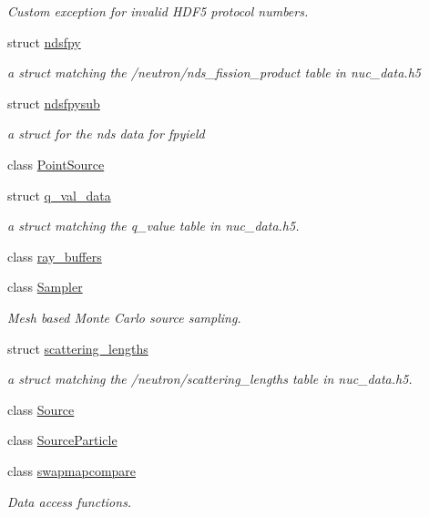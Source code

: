 \begin{DoxyCompactItemize}
\begin{DoxyCompactList}\small\item\em Custom exception for invalid H\+D\+F5 protocol numbers. \end{DoxyCompactList}\item 
struct \hyperlink{structpyne_1_1ndsfpy}{ndsfpy}
\begin{DoxyCompactList}\small\item\em a struct matching the \textquotesingle{}/neutron/nds\+\_\+fission\+\_\+product\textquotesingle{} table in nuc\+\_\+data.\+h5 \end{DoxyCompactList}\item 
struct \hyperlink{structpyne_1_1ndsfpysub}{ndsfpysub}
\begin{DoxyCompactList}\small\item\em a struct for the nds data for fpyield \end{DoxyCompactList}\item 
class \hyperlink{classpyne_1_1_point_source}{Point\+Source}
\item 
struct \hyperlink{structpyne_1_1q__val__data}{q\+\_\+val\+\_\+data}
\begin{DoxyCompactList}\small\item\em a struct matching the q\+\_\+value table in nuc\+\_\+data.\+h5. \end{DoxyCompactList}\item 
class \hyperlink{classpyne_1_1ray__buffers}{ray\+\_\+buffers}
\item 
class \hyperlink{classpyne_1_1_sampler}{Sampler}
\begin{DoxyCompactList}\small\item\em Mesh based Monte Carlo source sampling. \end{DoxyCompactList}\item 
struct \hyperlink{structpyne_1_1scattering__lengths}{scattering\+\_\+lengths}
\begin{DoxyCompactList}\small\item\em a struct matching the \textquotesingle{}/neutron/scattering\+\_\+lengths\textquotesingle{} table in nuc\+\_\+data.\+h5. \end{DoxyCompactList}\item 
class \hyperlink{classpyne_1_1_source}{Source}
\item 
class \hyperlink{classpyne_1_1_source_particle}{Source\+Particle}
\item 
class \hyperlink{classpyne_1_1swapmapcompare}{swapmapcompare}
\begin{DoxyCompactList}\small\item\em Data access functions. \end{DoxyCompactList}\item 

\end{DoxyCompactItemize}

